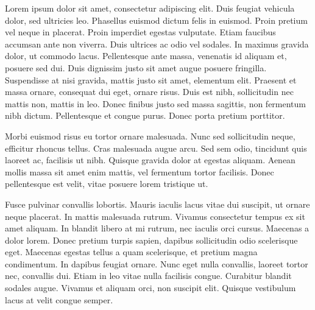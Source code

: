 \documentclass[a4paper,11pt]{article}
\begin{document}
\begin{mlsolution}


Lorem ipsum dolor sit amet, consectetur adipiscing elit. Duis feugiat vehicula dolor, sed ultricies leo. Phasellus euismod dictum felis in euismod. Proin pretium vel neque in placerat. Proin imperdiet egestas vulputate. Etiam faucibus accumsan ante non viverra. Duis ultrices ac odio vel sodales. In maximus gravida dolor, ut commodo lacus. Pellentesque ante massa, venenatis id aliquam et, posuere sed dui. Duis dignissim justo sit amet augue posuere fringilla. Suspendisse at nisi gravida, mattis justo sit amet, elementum elit. Praesent et massa ornare, consequat dui eget, ornare risus. Duis est nibh, sollicitudin nec mattis non, mattis in leo. Donec finibus justo sed massa sagittis, non fermentum nibh dictum. Pellentesque et congue purus. Donec porta pretium porttitor.

Morbi euismod risus eu tortor ornare malesuada. Nunc sed sollicitudin neque, efficitur rhoncus tellus. Cras malesuada augue arcu. Sed sem odio, tincidunt quis laoreet ac, facilisis ut nibh. Quisque gravida dolor at egestas aliquam. Aenean mollis massa sit amet enim mattis, vel fermentum tortor facilisis. Donec pellentesque est velit, vitae posuere lorem tristique ut.

Fusce pulvinar convallis lobortis. Mauris iaculis lacus vitae dui suscipit, ut ornare neque placerat. In mattis malesuada rutrum. Vivamus consectetur tempus ex sit amet aliquam. In blandit libero at mi rutrum, nec iaculis orci cursus. Maecenas a dolor lorem. Donec pretium turpis sapien, dapibus sollicitudin odio scelerisque eget. Maecenas egestas tellus a quam scelerisque, et pretium magna condimentum. In dapibus feugiat ornare. Nunc eget nulla convallis, laoreet tortor nec, convallis dui. Etiam in leo vitae nulla facilisis congue. Curabitur blandit sodales augue. Vivamus et aliquam orci, non suscipit elit. Quisque vestibulum lacus at velit congue semper.


\end{mlsolution}
\end{document}

